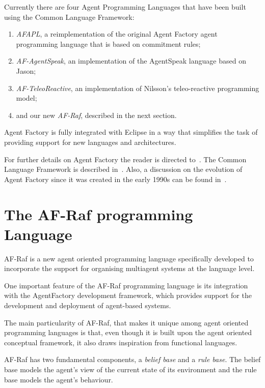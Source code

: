 \documentclass[a4paper,12pt,oneside,fleqn]{book} %
\theoremstyle{plain}
\theoremstyle{definition}
\theoremstyle{remark}
\begin{document}
Currently there are four Agent Programming Languages that have been built
using the Common Language Framework:
\begin{enumerate}

\item \textit{AFAPL}, a reimplementation of the original Agent Factory
agent programming language that is based on commitment rules;

\item \textit{AF-AgentSpeak}, an implementation of the AgentSpeak language based on Jason;

\item \textit{AF-TeleoReactive}, an implementation of Nilsson's teleo-reactive
programming model;

\item and our new \textit{AF-Raf}, described in the next section.
\end{enumerate}

Agent Factory is fully integrated with Eclipse in a way that simplifies
the task of providing support for new languages and architectures.

For further details on Agent Factory the reader is directed
to~\cite{collier2009modeling}. The Common Language Framework is described
in~\cite{russell2011af}. Also, a discussion on the evolution of Agent Factory since it
was created in the early 1990s can be found in~\cite{muldoon2009towards}.



\section{The AF-Raf programming Language} %

AF-Raf is a new agent oriented programming language specifically
developed to incorporate the support for organising multiagent
systems at the language level.

One important feature of the AF-Raf programming language is its integration
with the AgentFactory development framework, which provides support for the
development and deployment of agent-based systems.

The main particularity of AF-Raf, that makes it unique among agent oriented
programming languages is that, even though it is built upon the agent
oriented conceptual framework, it also draws inspiration from functional
languages.

AF-Raf has two fundamental components, a \textit{belief base}
and a \textit{rule base}. The belief base models the agent's view of the
current state of its environment and the rule base models the agent's
behaviour.
\end{document}
